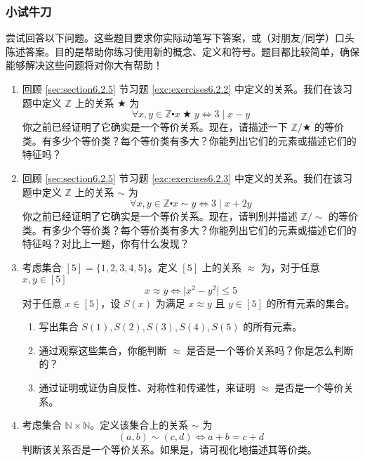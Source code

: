 \subsubsection*{小试牛刀}

尝试回答以下问题。这些题目要求你实际动笔写下答案，或（对朋友/同学）口头陈述答案。目的是帮助你练习使用新的概念、定义和符号。题目都比较简单，确保能够解决这些问题将对你大有帮助！

\begin{enumerate}[label=(\arabic*)]
    \item 回顾 \ref{sec:section6.2.5} 节习题 \ref{exc:exercises6.2.2} 中定义的关系。我们在该习题中定义 $\mathbb{Z}$ 上的关系 $\bigstar$ 为
    \[\forall x, y \in \mathbb{Z} \centerdot x \;\bigstar\; y \iff 3 \mid x - y\]
    你之前已经证明了它确实是一个等价关系。现在，请描述一下 $\mathbb{Z}/\bigstar$ 的等价类。有多少个等价类？每个等价类有多大？你能列出它们的元素或描述它们的特征吗？
    \item 回顾 \ref{sec:section6.2.5} 节习题 \ref{exc:exercises6.2.3} 中定义的关系。我们在该习题中定义 $\mathbb{Z}$ 上的关系 $\sim$ 为
    \[\forall x, y \in \mathbb{Z} \centerdot x \sim y \iff 3 \mid x + 2y\]
    你之前已经证明了它确实是一个等价关系。现在，请判别并描述 $\mathbb{Z}/\sim$ 的等价类。有多少个等价类？每个等价类有多大？你能列出它们的元素或描述它们的特征吗？对比上一题，你有什么发现？
    \item 考虑集合 $[5]=\{1,2,3,4,5\}$。定义 $[5]$ 上的关系 $\approx$ 为，对于任意 $x,y \in [5]$
    \[x \approx y \iff \vert x^2 - y^2 \vert \le 5\]
    对于任意 $x \in [5]$，设 $S(x)$ 为满足 $x \approx y$ 且 $y \in [5]$ 的所有元素的集合。
    \begin{enumerate}[label=(\alph*)]
        \item 写出集合 $S(1), S(2), S(3), S(4), S(5)$ 的所有元素。
        \item 通过观察这些集合，你能判断 $\approx$ 是否是一个等价关系吗？你是怎么判断的？
        \item 通过证明或证伪自反性、对称性和传递性，来证明 $\approx$ 是否是一个等价关系。
    \end{enumerate}
    \item 考虑集合 $\mathbb{N} \times \mathbb{N}$。定义该集合上的关系 $\sim$ 为
    \[(a, b) \sim (c, d) \iff a + b = c + d\]
    判断该关系否是一个等价关系。如果是，请可视化地描述其等价类。
\end{enumerate}